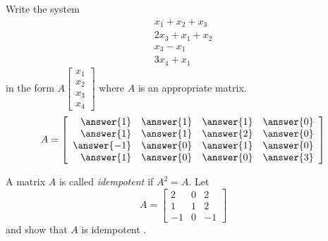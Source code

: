 \documentclass{ximera}
\begin{document}
\begin{problem}\label{prb:4.23} Write the system
\begin{equation*}
\begin{array}{c}
x_{1}+x_{2}+x_{3} \\
2x_{3}+x_{1}+x_{2} \\
x_{3}-x_{1} \\
3x_{4}+x_{1}
\end{array}
\end{equation*}
 in the form $A\left[
\begin{array}{c}
x_{1} \\
x_{2} \\
x_{3} \\
x_{4}
\end{array}
\right] $ where $A$ is an appropriate matrix.
$$A=\left[
\begin{array}{rrrr}
\answer{1} & \answer{1} & \answer{1} & \answer{0} \\
\answer{1} & \answer{1} & \answer{2} & \answer{0} \\
\answer{-1} & \answer{0} & \answer{1} & \answer{0} \\
\answer{1} & \answer{0} & \answer{0} & \answer{3}
\end{array}
\right] $$
\end{problem}


\begin{problem}\label{prb:4.24} A matrix $A$ is called {\em idempotent \em}if $A^{2}=A.$
Let
\begin{equation*}
A=
\left[
\begin{array}{rrr}
2 & 0 & 2 \\
1 & 1 & 2 \\
-1 & 0 & -1
\end{array}
\right]
\end{equation*}
and show that $A$ is idempotent .
\end{problem}
\end{document}
